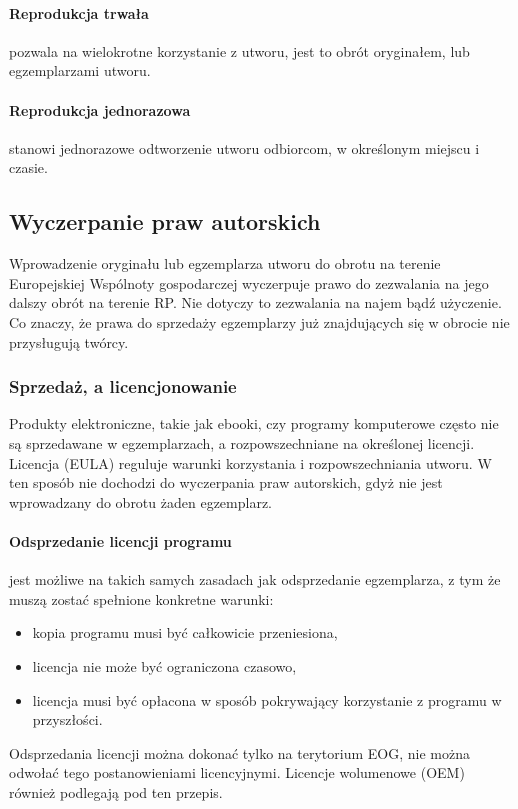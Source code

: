 \documentclass{article}
\begin{document}
\paragraph{Reprodukcja trwała}

pozwala na wielokrotne korzystanie z utworu, jest to obrót oryginałem, lub egzemplarzami utworu.

\paragraph{Reprodukcja jednorazowa}

stanowi jednorazowe odtworzenie utworu odbiorcom, w określonym miejscu i czasie.

\subsection{Wyczerpanie praw autorskich}

Wprowadzenie oryginału lub egzemplarza utworu do obrotu na terenie Europejskiej Wspólnoty gospodarczej wyczerpuje prawo do zezwalania na jego dalszy obrót na terenie RP. Nie dotyczy to zezwalania na najem bądź użyczenie.
Co znaczy, że prawa do sprzedaży egzemplarzy już znajdujących się w obrocie nie przysługują twórcy.

\subsubsection{Sprzedaż, a licencjonowanie}

Produkty elektroniczne, takie jak ebooki, czy programy komputerowe często nie są sprzedawane w egzemplarzach, a rozpowszechniane na określonej licencji. Licencja (EULA) reguluje warunki korzystania i rozpowszechniania utworu. W ten sposób nie dochodzi do wyczerpania praw autorskich, gdyż nie jest wprowadzany do obrotu żaden egzemplarz.

\paragraph{Odsprzedanie licencji programu}

jest możliwe na takich samych zasadach jak odsprzedanie egzemplarza, z tym że muszą zostać spełnione konkretne warunki:
\begin{itemize}
  \item kopia programu musi być całkowicie przeniesiona,
  \item licencja nie może być ograniczona czasowo,
  \item licencja musi być opłacona w sposób pokrywający korzystanie z programu w przyszłości.
\end{itemize}
Odsprzedania licencji można dokonać tylko na terytorium EOG, nie można odwołać tego postanowieniami licencyjnymi. Licencje wolumenowe (OEM) również podlegają pod ten przepis.
\end{document}
